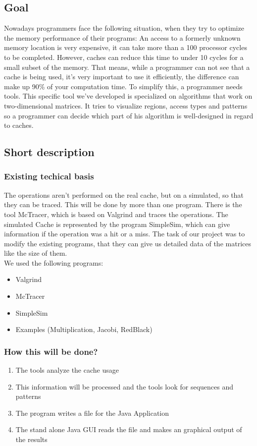 \subsection{Goal}
Nowadays programmers face the following situation, when they try to optimize the memory performance of their programs: An access to a formerly unknown memory location is very expensive, it can take more than a 100 processor cycles to be completed. However, caches can reduce this time to under 10 cycles for a small subset of the memory. That means, while a programmer can not see that a cache is being used, it's very important to use it efficiently, the difference can make up 90\% of your computation time.\newline
To simplify this, a programmer needs tools. This specific tool we've developed is specialized on algorithms that work on two-dimensional matrices. It tries to visualize regions, access types and patterns so a programmer can decide which part of his algorithm is well-designed in regard to caches.

\subsection{Short description}
\subsubsection{Existing techical basis}
The operations aren't performed on the real cache, but on a simulated, so that they can be traced. This will be done by more than one program. There is the tool McTracer, which is based on Valgrind and traces the operations. The simulated Cache is represented by the program SimpleSim, which can give information if the operation was a hit or a miss. The task of our project was to modify the existing programs, that they can give us detailed data of the matrices like the size of them.
\\

We used the following programs:
\begin{itemize}
\item Valgrind
\item McTracer
\item SimpleSim
\item Examples (Multiplication, Jacobi, RedBlack)
\end{itemize}

\subsubsection{How this will be done?}
\begin{enumerate}
\item The tools analyze the cache usage
\item This information will be processed and the tools look for sequences and patterns
\item The program writes a file for the Java Application
\item The stand alone Java GUI reads the file and makes an graphical output of the results
\end{enumerate}

